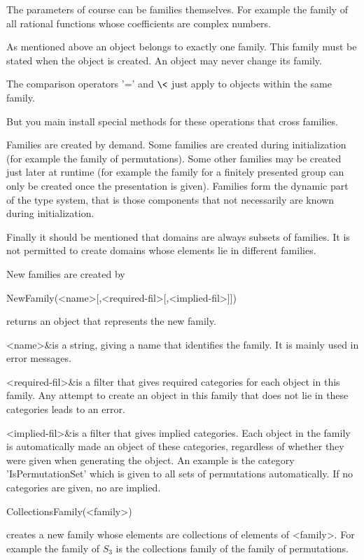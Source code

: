 \danger
The parameters of course can be families themselves. For example the family
of all rational functions whose coefficients are complex numbers. 

As mentioned above an object belongs to exactly one family. This family must
be stated when the object is created. An object may never change its family.

The comparison operators '=' and $\<$ just apply to objects within the same
family.

\danger
But you main install special methods for these operations that cross
families.

\danger
Families are created by demand. Some families are created during
initialization (for example the family of permutations). Some other families
may be created just later at runtime (for example the family for a finitely
presented group can only be created once the presentation is given).
Families form the dynamic part of the type system, that is those components
that not necessarily are known during initialization.

Finally it should be mentioned that domains are always subsets of families.
It is not permitted to create domains whose elements lie in different
families.

New families are created by 

\>NewFamily(<name>[,<required-fil>[,<implied-fil>]])

returns an object that represents the new family.

\beginitems
<name>&is a string, giving a name that identifies the family. It is mainly
used in error messages.

<required-fil>&is a filter that gives required categories for each object in
this family. Any attempt to create an object in this family that does not
lie in these categories leads to an error.

<implied-fil>&is a filter that gives implied categories.
Each object in the
family is automatically made an object of these categories, regardless of
whether they were given when generating the object. An example is the
category 'IsPermutationSet' which is given to all sets of permutations
automatically.
If no categories are given, no are implied.
\enditems

\>CollectionsFamily(<family>)

creates a new family whose elements are collections of elements of <family>.
For example the family of $S_3$ is the collections family of the family of
permutations.

